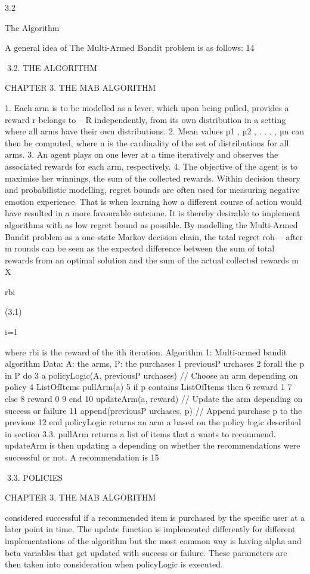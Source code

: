 3.2

The Algorithm

A general idea of The Multi-Armed Bandit problem is as follows:
14

3.2. THE ALGORITHM

CHAPTER 3. THE MAB ALGORITHM

1. Each arm is to be modelled as a lever, which upon being pulled, provides a reward
r belongs to -- R independently, from its own distribution in a setting where all arms have
their own distributions.
2. Mean values µ1 , µ2 , . . . , µn can then be computed, where n is the cardinality of the
set of distributions for all arms.
3. An agent plays on one lever at a time iteratively and observes the associated
rewards for each arm, respectively.
4. The objective of the agent is to maximise her winnings, the sum of the collected
rewards.
Within decision theory and probabilistic modelling, regret bounds are often used for
measuring negative emotion experience. That is when learning how a different course
of action would have resulted in a more favourable outcome. It is thereby desirable to
implement algorithms with as low regret bound as possible.
By modelling the Multi-Armed Bandit problem as a one-state Markov decision chain,
the total regret roh--- after m rounds can be seen as the expected difference between the sum
of total rewards from an optimal solution and the sum of the actual collected rewards
m
X

rbi

(3.1)

i=1

where rbi is the reward of the ith iteration.
Algorithm 1: Multi-armed bandit algorithm
Data: A: the arms, P: the purchases
1 previousP urchases  {}
2 forall the p in P do
3
a  policyLogic(A, previousP urchases) // Choose an arm depending on
policy
4
ListOfItems pullArm(a)
5
if p contains ListOfItems then
6
reward 1
7
else
8
reward 0
9
end
10
updateArm(a, reward) // Update the arm depending on success or failure
11
append(previousP urchases, p) // Append purchase p to the previous
12 end
policyLogic returns an arm a based on the policy logic described in section 3.3. pullArm
returns a list of items that a wants to recommend. updateArm is then updating a depending on whether the recommendations were successful or not. A recommendation is
15

3.3. POLICIES

CHAPTER 3. THE MAB ALGORITHM

considered successful if a recommended item is purchased by the specific user at a later
point in time. The update function is implemented differently for different implementations of the algorithm but the most common way is having alpha and beta variables that
get updated with success or failure. These parameters are then taken into consideration
when policyLogic is executed.

